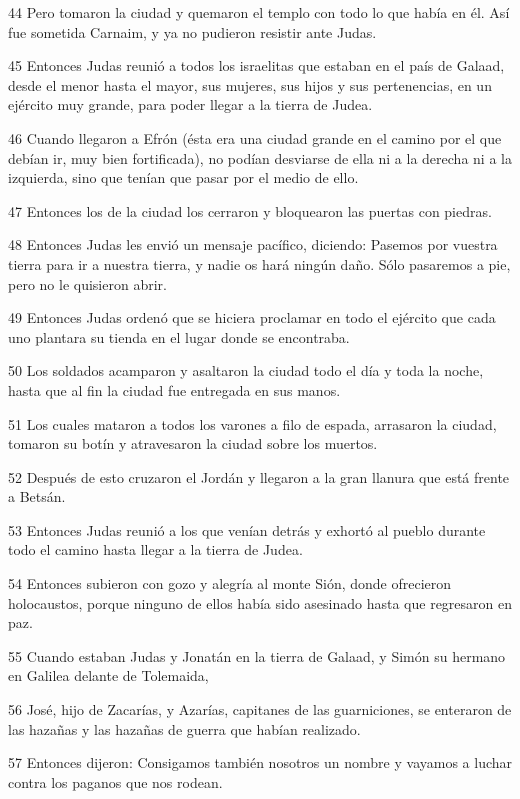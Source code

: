 \par 44 Pero tomaron la ciudad y quemaron el templo con todo lo que había en él. Así fue sometida Carnaim, y ya no pudieron resistir ante Judas.
\par 45 Entonces Judas reunió a todos los israelitas que estaban en el país de Galaad, desde el menor hasta el mayor, sus mujeres, sus hijos y sus pertenencias, en un ejército muy grande, para poder llegar a la tierra de Judea.
\par 46 Cuando llegaron a Efrón (ésta era una ciudad grande en el camino por el que debían ir, muy bien fortificada), no podían desviarse de ella ni a la derecha ni a la izquierda, sino que tenían que pasar por el medio de ello.
\par 47 Entonces los de la ciudad los cerraron y bloquearon las puertas con piedras.
\par 48 Entonces Judas les envió un mensaje pacífico, diciendo: Pasemos por vuestra tierra para ir a nuestra tierra, y nadie os hará ningún daño. Sólo pasaremos a pie, pero no le quisieron abrir.
\par 49 Entonces Judas ordenó que se hiciera proclamar en todo el ejército que cada uno plantara su tienda en el lugar donde se encontraba.
\par 50 Los soldados acamparon y asaltaron la ciudad todo el día y toda la noche, hasta que al fin la ciudad fue entregada en sus manos.
\par 51 Los cuales mataron a todos los varones a filo de espada, arrasaron la ciudad, tomaron su botín y atravesaron la ciudad sobre los muertos.
\par 52 Después de esto cruzaron el Jordán y llegaron a la gran llanura que está frente a Betsán.
\par 53 Entonces Judas reunió a los que venían detrás y exhortó al pueblo durante todo el camino hasta llegar a la tierra de Judea.
\par 54 Entonces subieron con gozo y alegría al monte Sión, donde ofrecieron holocaustos, porque ninguno de ellos había sido asesinado hasta que regresaron en paz.
\par 55 Cuando estaban Judas y Jonatán en la tierra de Galaad, y Simón su hermano en Galilea delante de Tolemaida,
\par 56 José, hijo de Zacarías, y Azarías, capitanes de las guarniciones, se enteraron de las hazañas y las hazañas de guerra que habían realizado.
\par 57 Entonces dijeron: Consigamos también nosotros un nombre y vayamos a luchar contra los paganos que nos rodean.
